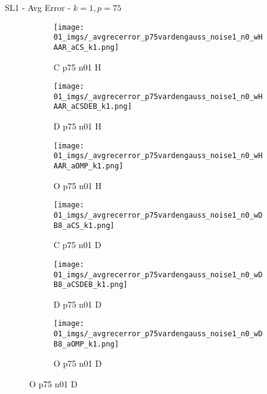 \begin{frame}{SL1 - Avg Error - $k=1,p=75$}{}
\begin{figure}
\begin{subfigure}{0.13\textwidth}
\texttt{[image: 01\_imgs/\_avgrecerror\_p75vardengauss\_noise1\_n0\_wHAAR\_aCS\_k1.png]}
\caption*{\tiny C p75 n01 H}
\end{subfigure}
\begin{subfigure}{0.13\textwidth}
\texttt{[image: 01\_imgs/\_avgrecerror\_p75vardengauss\_noise1\_n0\_wHAAR\_aCSDEB\_k1.png]}
\caption*{\tiny D p75 n01 H}
\end{subfigure}
\begin{subfigure}{0.13\textwidth}
\texttt{[image: 01\_imgs/\_avgrecerror\_p75vardengauss\_noise1\_n0\_wHAAR\_aOMP\_k1.png]}
\caption*{\tiny O p75 n01 H}
\end{subfigure}
\begin{subfigure}{0.13\textwidth}
\texttt{[image: 01\_imgs/\_avgrecerror\_p75vardengauss\_noise1\_n0\_wDB8\_aCS\_k1.png]}
\caption*{\tiny C p75 n01 D}
\end{subfigure}
\begin{subfigure}{0.13\textwidth}
\texttt{[image: 01\_imgs/\_avgrecerror\_p75vardengauss\_noise1\_n0\_wDB8\_aCSDEB\_k1.png]}
\caption*{\tiny D p75 n01 D}
\end{subfigure}
\begin{subfigure}{0.13\textwidth}
\texttt{[image: 01\_imgs/\_avgrecerror\_p75vardengauss\_noise1\_n0\_wDB8\_aOMP\_k1.png]}
\caption*{\tiny O p75 n01 D}
\end{subfigure}

\vspace{5pt}


\end{figure}
\end{frame}
